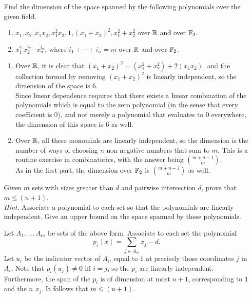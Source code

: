 \documentclass{article}
\begin{document}
	\begin{exercise}
		\label{ex:2.1}
		Find the dimension of the space spanned by the following polynomials over the given field.
		\begin{enumerate}[label=(\alph*)]
			\item $x_1, x_2, x_1x_2, x_1^2x_2, 1, (x_1+x_2)^2, x_1^2+x_2^2$ over $\mathbb{R}$ and over $\mathbb{F}_2$.
			\item $x_1^{i_1}x_2^{i_2}\cdots x_n^{i_n}$, where $i_1 + \cdots + i_n = m$ over $\mathbb{R}$ and over $\mathbb{F}_2$.
		\end{enumerate}
	\end{exercise}
	\begin{solution*}
		\begin{enumerate}[label=(\alph*)]
			\item Over $\mathbb{R}$, it is clear that $(x_1 + x_2)^2 = (x_1^2 + x_2^2) + 2(x_1x_2)$, and the collection formed by removing $(x_1 + x_2)^2$ is linearly independent, so the dimension of the space is $6$.\\
			Since linear dependence requires that there exists a linear combination of the polynomials which is equal to the zero polynomial (in the sense that every coefficient is $0$), and not merely a polynomial that evaluates to $0$ everywhere, the dimension of this space is $6$ as well.

			\item Over $\mathbb{R}$, all these monomials are linearly independent, so the dimension is the number of ways of choosing $n$ non-negative numbers that sum to $m$. This is a routine exercise in combinatorics, with the answer being $\binom{m+n-1}{m}$.\\
			As in the first part, the dimension over $\mathbb{F}_2$ is $\binom{m+n-1}{m}$ as well.
		\end{enumerate}
	\end{solution*}

	\begin{exercise}
		Given $m$ sets with sizes greater than $d$ and pairwise intersection $d$, prove that $m \le (n+1)$.\\
		\emph{Hint.} \textcolor{gray!20}{Associate a polynomial to each set so that the polynomials are linearly independent. Give an upper bound on the space spanned by these polynomials.}
	\end{exercise}
	\begin{solution*}
		Let $A_1,\ldots,A_m$ be sets of the above form. Associate to each set the polynomial
		\[ p_i(x) = \sum_{j \in A_m} x_j - d. \]
		Let $u_i$ be the indicator vector of $A_i$, equal to $1$ at precisely those coordinates $j$ in $A_i$. Note that $p_i(u_j) \ne 0$ iff $i = j$, so the $p_i$ are linearly independent. Furthermore, the span of the $p_i$ is of dimension at most $n+1$, corresponding to $1$ and the $n$ $x_j$. It follows that $m \le (n+1)$.
	\end{solution*}
\end{document}
